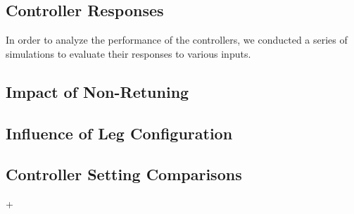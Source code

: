 \subsection{Controller Responses}
In order to analyze the performance of the controllers, we conducted a series of simulations to evaluate their responses to various inputs.

\subsection{Impact of Non-Retuning}

\subsection{Influence of Leg Configuration}
\subsection{Controller Setting Comparisons}
+










	


